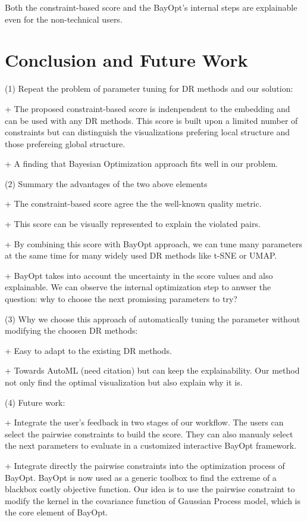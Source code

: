 \par
Both the constraint-based score and the BayOpt's internal steps are explainable even for the non-technical users. 


\section{Conclusion and Future Work}

\par (1) Repeat the problem of parameter tuning for DR methods and our solution:

+ The proposed constraint-based score is indenpendent to the embedding and can be used with any DR methods.
This score is built upon a limited number of constraints but can distinguish the visualizations prefering local structure and those prefereing global structure.

+ A finding that Bayesian Optimization approach fits well in our problem.


\vspace{8pt}
\par (2) Summary the advantages of the two above elements

+ The constraint-based score agree the the well-known quality metric.

+ This score can be visually represented to explain the violated pairs.

+ By combining this score with BayOpt approach, we can tune many parameters at the same time for many widely used DR methods like t-SNE or UMAP.

+ BayOpt takes into account the uncertainty in the score values and also explainable. We can observe the internal optimization step to anwser the question: why to choose the next promissing parameters to try?

\vspace{8pt}
\par (3) Why we choose this approach of automatically tuning the parameter without modifying the choosen DR methods:

+ Easy to adapt to the existing DR methods. 

+ Towards AutoML (need citation) but can keep the explainability. Our method not only find the optimal visualization but also explain why it is.


\vspace{8pt}
\par (4) Future work:

+ Integrate the user's feedback in two stages of our workflow.
The users can select the pairwise constraints to build the score.
They can also manualy select the next parameters to evaluate in a customized interactive BayOpt framework.

+ Integrate directly the pairwise constraints into the optimization process of BayOpt.
BayOpt is now used as a generic toolbox to find the extreme of a blackbox costly objective function.
Our idea is to use the pairwise constraint to modify the kernel in the covariance function of Gaussian Process model, which is the core element of BayOpt.
